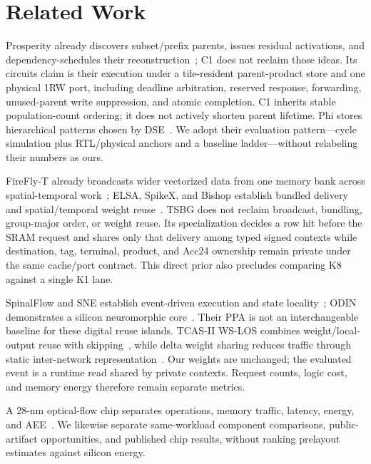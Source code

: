 \documentclass[journal]{IEEEtran}
\begin{document}
\section{Related Work}
Prosperity already discovers subset/prefix parents, issues residual
activations, and dependency-schedules their reconstruction~\cite{prosperity};
C1 does not reclaim those ideas.  Its circuits claim is their execution under
a tile-resident parent-product store and one physical 1RW port, including
deadline arbitration, reserved response, forwarding, unused-parent write
suppression, and atomic completion.  C1 inherits stable population-count
ordering; it does not actively shorten parent lifetime.  Phi stores
hierarchical patterns chosen by DSE~\cite{phi}.  We adopt their evaluation
pattern---cycle simulation plus RTL/physical anchors and a baseline
ladder---without relabeling their numbers as ours.

FireFly-T already broadcasts wider vectorized data from one memory bank across
spatial-temporal work~\cite{fireflyt}; ELSA, SpikeX, and Bishop establish bundled
delivery and spatial/temporal weight reuse~\cite{elsa,spikex,bishop}.  TSBG does
not reclaim broadcast, bundling, group-major order, or weight reuse.  Its
specialization decides a row hit before the SRAM request and shares only that
delivery among typed signed contexts while destination, tag, terminal,
product, and Acc24 ownership remain private under the same cache/port contract.
This direct prior also precludes comparing K8 against a single K1 lane.

SpinalFlow and SNE establish event-driven execution and state
locality~\cite{spinalflow,sne}; ODIN demonstrates a silicon neuromorphic
core~\cite{frenkel2019odin}.  Their PPA is not an interchangeable baseline
for these digital reuse islands.  TCAS-II WS-LOS combines weight/local-output
reuse with skipping~\cite{wslos2023}, while delta weight sharing reduces
traffic through static inter-network representation~\cite{an2024dws}.
Our weights are unchanged; the evaluated event is a runtime read shared by
private contexts.  Request counts, logic cost, and memory energy therefore
remain separate metrics.

A 28-nm optical-flow chip separates operations, memory traffic, latency,
energy, and AEE~\cite{ciccflow}.  We likewise separate same-workload component
comparisons, public-artifact opportunities, and published chip results,
without ranking prelayout estimates against silicon energy.
\end{document}
